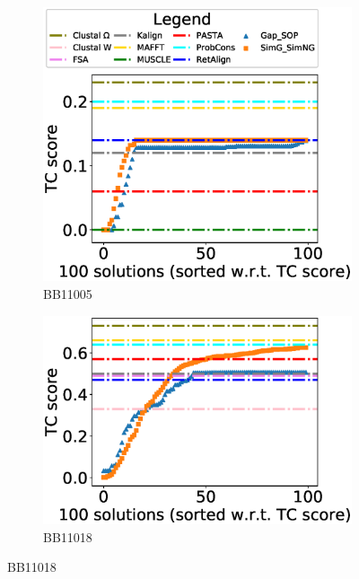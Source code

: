\begin{figure}[!htbp]
	\begin{adjustwidth}{-1cm}{-1cm}
		\centering
		\begin{subfigure}[b]{0.26\textwidth}
			\includegraphics[width=\columnwidth]{Figure/summary/precomputedInit/Balibase/BB11005_tc_density_single_run_2}
			\caption{BB11005}
\end{subfigure}    
		\begin{subfigure}[b]{0.26\textwidth}
			\includegraphics[width=\columnwidth]{Figure/summary/precomputedInit/Balibase/BB11018_tc_density_single_run_2}
			\caption{BB11018}
\end{subfigure}

\end{adjustwidth}
\end{figure}
